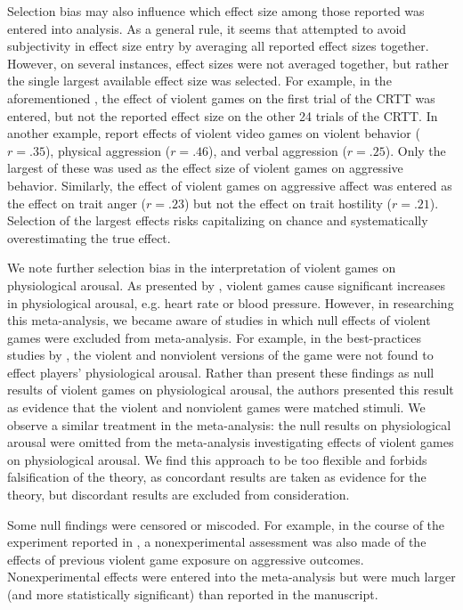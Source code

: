 \documentclass[man]{apa6}
\begin{document}
Selection bias may also influence which effect size among those reported was entered into analysis. As a general rule, it seems that \citet{Anderson:etal:2010} attempted to avoid subjectivity in effect size entry by averaging all reported effect sizes together. However, on several instances, effect sizes were not averaged together, but rather the single largest available effect size was selected. For example, in the aforementioned \citet[study 2]{Anderson:etal:2004}, the effect of violent games on the first trial of the CRTT was entered, but not the reported effect size on the other 24 trials of the CRTT. In another example, \citet[study 2]{Anderson:etal:2007} report effects of violent video games on violent behavior ($r = .35$), physical aggression ($r = .46$), and verbal aggression ($r = .25$). Only the largest of these was used as the effect size of violent games on aggressive behavior. Similarly, the effect of violent games on aggressive affect was entered as the effect on trait anger ($r = .23$) but not the effect on trait hostility ($r = .21$). Selection of the largest effects risks capitalizing on chance and systematically overestimating the true effect.

We note further selection bias in the interpretation of violent games on physiological arousal. As presented by \citet{Anderson:etal:2010}, violent games cause significant increases in physiological arousal, e.g. heart rate or blood pressure. However, in researching this meta-analysis, we became aware of studies in which null effects of violent games were excluded from meta-analysis. For example, in the best-practices studies by \citet{Carnagey:Anderson:2005}, the violent and nonviolent versions of the game were not found to effect players' physiological arousal. Rather than present these findings as null results of violent games on physiological arousal, the authors presented this result as evidence that the violent and nonviolent games were matched stimuli. We observe a similar treatment in the meta-analysis: the null results on physiological arousal were omitted from the meta-analysis investigating effects of violent games on physiological arousal. We find this approach to be too flexible and forbids falsification of the theory, as concordant results are taken as evidence for the theory, but discordant results are excluded from consideration.

Some null findings were censored or miscoded. For example, in the course of the experiment reported in \citet{Carnagey:Anderson:2005}, a nonexperimental assessment was also made of the effects of previous violent game exposure on aggressive outcomes. Nonexperimental effects were entered into the \citet{Anderson:etal:2010} meta-analysis but were much larger (and more statistically significant) than reported in the \citet{Carnagey:Anderson:2005} manuscript.
\end{document}
